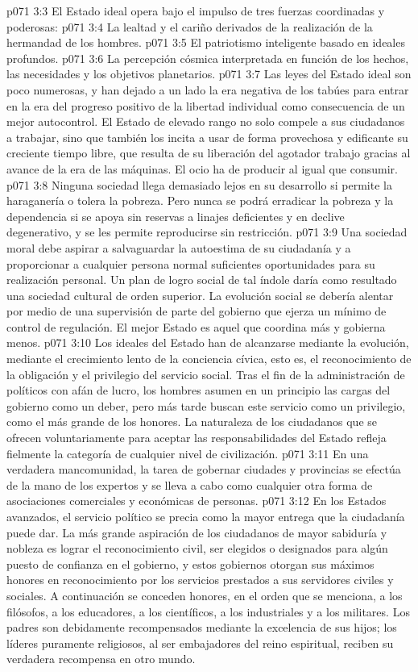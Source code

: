 \vs p071 3:3 \pc El Estado ideal opera bajo el impulso de tres fuerzas coordinadas y poderosas:
\vs p071 3:4 La lealtad y el cariño derivados de la realización de la hermandad de los hombres.
\vs p071 3:5 El patriotismo inteligente basado en ideales profundos.
\vs p071 3:6 La percepción cósmica interpretada en función de los hechos, las necesidades y los objetivos planetarios.
\vs p071 3:7 \pc Las leyes del Estado ideal son poco numerosas, y han dejado a un lado la era negativa de los tabúes para entrar en la era del progreso positivo de la libertad individual como consecuencia de un mejor autocontrol. El Estado de elevado rango no solo compele a sus ciudadanos a trabajar, sino que también los incita a usar de forma provechosa y edificante su creciente tiempo libre, que resulta de su liberación del agotador trabajo gracias al avance de la era de las máquinas. El ocio ha de producir al igual que consumir.
\vs p071 3:8 Ninguna sociedad llega demasiado lejos en su desarrollo si permite la haraganería o tolera la pobreza. Pero nunca se podrá erradicar la pobreza y la dependencia si se apoya sin reservas a linajes deficientes y en declive degenerativo, y se les permite reproducirse sin restricción.
\vs p071 3:9 Una sociedad moral debe aspirar a salvaguardar la autoestima de su ciudadanía y a proporcionar a cualquier persona normal suficientes oportunidades para su realización personal. Un plan de logro social de tal índole daría como resultado una sociedad cultural de orden superior. La evolución social se debería alentar por medio de una supervisión de parte del gobierno que ejerza un mínimo de control de regulación. El mejor Estado es aquel que coordina más y gobierna menos.
\vs p071 3:10 Los ideales del Estado han de alcanzarse mediante la evolución, mediante el crecimiento lento de la conciencia cívica, esto es, el reconocimiento de la obligación y el privilegio del servicio social. Tras el fin de la administración de políticos con afán de lucro, los hombres asumen en un principio las cargas del gobierno como un deber, pero más tarde buscan este servicio como un privilegio, como el más grande de los honores. La naturaleza de los ciudadanos que se ofrecen voluntariamente para aceptar las responsabilidades del Estado refleja fielmente la categoría de cualquier nivel de civilización.
\vs p071 3:11 En una verdadera mancomunidad, la tarea de gobernar ciudades y provincias se efectúa de la mano de los expertos y se lleva a cabo como cualquier otra forma de asociaciones comerciales y económicas de personas.
\vs p071 3:12 En los Estados avanzados, el servicio político se precia como la mayor entrega que la ciudadanía puede dar. La más grande aspiración de los ciudadanos de mayor sabiduría y nobleza es lograr el reconocimiento civil, ser elegidos o designados para algún puesto de confianza en el gobierno, y estos gobiernos otorgan sus máximos honores en reconocimiento por los servicios prestados a sus servidores civiles y sociales. A continuación se conceden honores, en el orden que se menciona, a los filósofos, a los educadores, a los científicos, a los industriales y a los militares. Los padres son debidamente recompensados mediante la excelencia de sus hijos; los líderes puramente religiosos, al ser embajadores del reino espiritual, reciben su verdadera recompensa en otro mundo.
